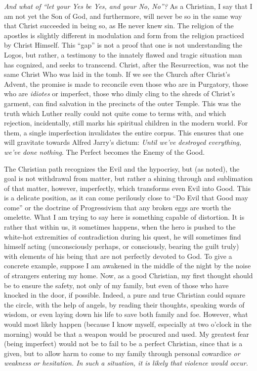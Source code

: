 \emph{And what of ``let your Yes be Yes, and your No, No''?} As a Christian, I say that I am not yet the Son of God, and furthermore, will never be so in the same way that Christ succeeded in being so, as He never knew sin. The religion of the apostles is slightly different in modulation and form from the religion practiced by Christ Himself. This ``gap'' is not a proof that one is not understanding the Logos, but rather, a testimony to the innately flawed and tragic situation man has cognized, and seeks to transcend. Christ, after the Resurrection, was not the same Christ Who was laid in the tomb. If we see the Church after Christ's Advent, the promise is made to reconcile even those who are in Purgatory, those who are \emph{idiotes} or imperfect, those who dimly cling to the shreds of Christ's garment, can find salvation in the precincts of the outer Temple. This was the truth which Luther really could not quite come to terms with, and which rejection, incidentally, still marks his spiritual children in the modern world. For them, a single imperfection invalidates the entire corpus. This ensures that one will gravitate towards Alfred Jarry's dictum: \emph{Until we've destroyed everything, we've done nothing}. The Perfect becomes the Enemy of the Good.

The Christian path recognizes the Evil and the hypocrisy, but (as noted), the goal is not withdrawal from matter, but rather a shining through and sublimation of that matter, however, imperfectly, which transforms even Evil into Good. This is a delicate position, as it can come perilously close to ``Do Evil that Good may come'' or the doctrine of Progressivism that any broken eggs are worth the omelette. What I am trying to say here is something capable of distortion. It is rather that within us, it sometimes happens, when the hero is pushed to the white-hot extremities of contradiction during his quest, he will sometimes find himself acting (unconsciously perhaps, or consciously, bearing the guilt truly) with elements of his being that are not perfectly devoted to God. To give a concrete example, suppose I am awakened in the middle of the night by the noise of strangers entering my home. Now, as a good Christian, my first thought should be to ensure the safety, not only of my family, but even of those who have knocked in the door, if possible. Indeed, a pure and true Christian could square the circle, with the help of angels, by reading their thoughts, speaking words of wisdom, or even laying down his life to save both family and foe. However, what would most likely happen (because I know myself, especially at two o'clock in the morning) would be that a weapon would be procured and used. My greatest fear (being imperfect) would not be to fail to be a perfect Christian, since that is a given, but to allow harm to come to my family through personal cowardice \emph{or weakness or hesitation. In such a situation, it is likely that violence would occur.}

